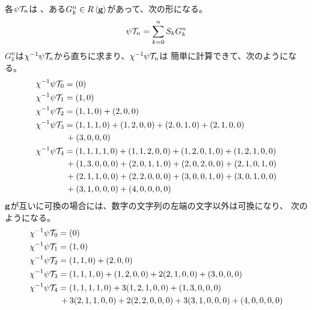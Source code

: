 {	各$\psi{\mathcal{T}}_n$は
	、ある$G^n_k\in R\mathinner{\langle{\mathbf{g}}\rangle}$があって、次の形になる。
	\begin{equation*}\begin{split}
		\psi{\mathcal{T}}_n = \sum_{k=0}^n S_{k}G^n_k
	\end{split}\end{equation*}
	$G^n_k$は$\chi^{-1}\psi{\mathcal{T}}_n$から直ちに求まり、$\chi^{-1}\psi{\mathcal{T}}_n$は
	簡単に計算できて、次のようになる。
	\begin{equation*}\begin{split}
		\chi^{-1}\psi{\mathcal{T}}_0 &= (0) \\
		\chi^{-1}\psi{\mathcal{T}}_1 &= (1, 0) \\
		\chi^{-1}\psi{\mathcal{T}}_2 &= (1, 1, 0) + (2, 0, 0) \\
		\chi^{-1}\psi{\mathcal{T}}_3 &= (1, 1, 1, 0) + (1, 2, 0, 0) + (2, 0, 1, 0) 
			+ (2, 1, 0, 0) \\
			&\, + (3, 0, 0, 0) \\
		\chi^{-1}\psi{\mathcal{T}}_4 &= (1, 1, 1, 1, 0) + (1, 1, 2, 0, 0) 
			+ (1, 2, 0, 1, 0) + (1, 2, 1, 0, 0) \\
			&\, + (1, 3, 0, 0, 0) + (2, 0, 1, 1, 0) + (2, 0, 2, 0, 0) 
			+ (2, 1, 0, 1, 0) \\
			&\, + (2, 1, 1, 0, 0) + (2, 2, 0, 0, 0) + (3, 0, 0, 1, 0) 
			+ (3, 0, 1, 0, 0) \\
			&\,+ (3, 1, 0, 0, 0) + (4, 0, 0, 0, 0)
	\end{split}\end{equation*}
	$\mathbf{g}$が互いに可換の場合には、数字の文字列の左端の文字以外は可換になり、
	次のようになる。
	\begin{equation*}\begin{split}
		\chi^{-1}\psi{\mathcal{T}}_0 &= (0) \\
		\chi^{-1}\psi{\mathcal{T}}_1 &= (1, 0) \\
		\chi^{-1}\psi{\mathcal{T}}_2 &= (1, 1, 0) + (2, 0, 0) \\
		\chi^{-1}\psi{\mathcal{T}}_3 &= (1, 1, 1, 0) + (1, 2, 0, 0) + 2(2, 1, 0, 0) 
			+ (3, 0, 0, 0) \\
		\chi^{-1}\psi{\mathcal{T}}_4 &= (1, 1, 1, 1, 0) + 3(1, 2, 1, 0, 0) 
			+ (1, 3, 0, 0, 0) \\
			&\, + 3(2, 1, 1, 0, 0) + 2(2, 2, 0, 0, 0) + 3(3, 1, 0, 0, 0) 
			+ (4, 0, 0, 0, 0)
	\end{split}\end{equation*}

}
